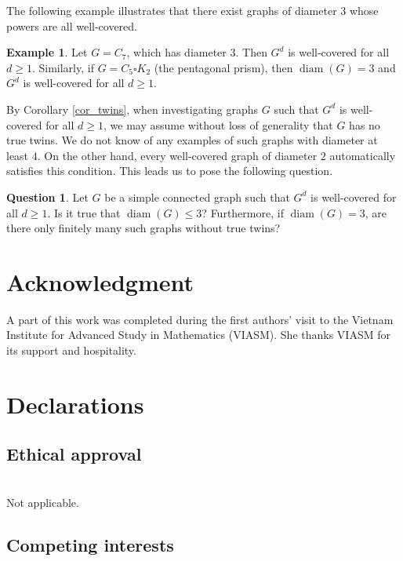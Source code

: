 \documentclass[10pt,a4paper]{amsart}
\numberwithin{equation}{section}
\theoremstyle{definition}
\newtheorem{exam}[thm]{Example}
\newtheorem{quest}[thm]{Question}
\begin{document}
The following example illustrates that there exist graphs of diameter $3$ whose powers are all well-covered.

\begin{exam}
Let $G = C_7$, which has diameter $3$. Then $G^d$ is well-covered for all $d \ge 1$. Similarly, if $G = C_5 \square K_2$ (the pentagonal prism), then $\operatorname{diam}(G) = 3$ and $G^d$ is well-covered for all $d \ge 1$.
\end{exam}

By Corollary \ref{cor_twins}, when investigating graphs $G$ such that $G^d$ is well-covered for all $d \ge 1$, we may assume without loss of generality that $G$ has no true twins. We do not know of any examples of such graphs with diameter at least $4$. On the other hand, every well-covered graph of diameter $2$ automatically satisfies this condition. This leads us to pose the following question.

\begin{quest}
Let $G$ be a simple connected graph such that $G^d$ is well-covered for all $d \ge 1$. Is it true that $\operatorname{diam}(G) \le 3$? Furthermore, if $\operatorname{diam}(G) = 3$, are there only finitely many such graphs without true twins?
\end{quest}

\section{Acknowledgment} 
A part of this work was completed during the first authors' visit to the Vietnam Institute for Advanced Study in Mathematics (VIASM). She thanks VIASM for its support and hospitality. 
   
  
  \section*{Declarations}
  
  
  \subsection*{\bf Ethical approval}\ \\[-0.3cm]
  
  \noindent Not applicable.
  
  
  \subsection*{\bf Competing interests}\ \\[-0.3cm]
  
\end{document}
